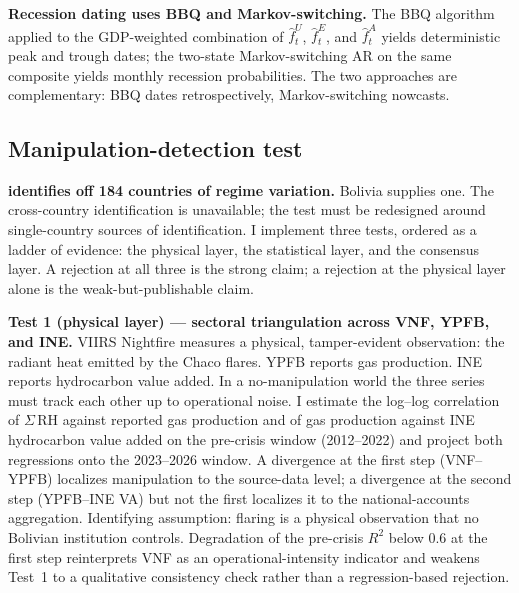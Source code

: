 \documentclass[11pt,letterpaper]{article}
\newcommand{\claim}[1]{\textbf{#1.}}
\begin{document}
\claim{Recession dating uses BBQ and Markov-switching} The \citet{harding_pagan2002} BBQ algorithm applied to the GDP-weighted combination of $\hat{f}_t^U$, $\hat{f}_t^E$, and $\hat{f}_t^A$ yields deterministic peak and trough dates; the \citet{hamilton1989} two-state Markov-switching AR on the same composite yields monthly recession probabilities. The two approaches are complementary: BBQ dates retrospectively, Markov-switching nowcasts.

\subsection{Manipulation-detection test}

\claim{\citet{martinez2022} identifies off 184 countries of regime variation} Bolivia supplies one. The cross-country identification is unavailable; the test must be redesigned around single-country sources of identification. I implement three tests, ordered as a ladder of evidence: the physical layer, the statistical layer, and the consensus layer. A rejection at all three is the strong claim; a rejection at the physical layer alone is the weak-but-publishable claim.

\claim{Test 1 (physical layer) --- sectoral triangulation across VNF, YPFB, and INE} VIIRS Nightfire measures a physical, tamper-evident observation: the radiant heat emitted by the Chaco flares. YPFB reports gas production. INE reports hydrocarbon value added. In a no-manipulation world the three series must track each other up to operational noise. I estimate the log--log correlation of $\Sigma\,\mathrm{RH}$ against reported gas production and of gas production against INE hydrocarbon value added on the pre-crisis window (\numrange{2012}{2022}) and project both regressions onto the \numrange{2023}{2026} window. A divergence at the first step (VNF--YPFB) localizes manipulation to the source-data level; a divergence at the second step (YPFB--INE VA) but not the first localizes it to the national-accounts aggregation. Identifying assumption: flaring is a physical observation that no Bolivian institution controls. Degradation of the pre-crisis $R^2$ below \num{0.6} at the first step reinterprets VNF as an operational-intensity indicator and weakens Test~1 to a qualitative consistency check rather than a regression-based rejection.
\end{document}
